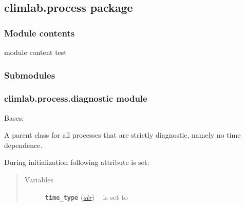 \documentclass[letterpaper,10pt,english]{sphinxmanual}
\begin{document}
\subsection{climlab.process package}
\label{api/climlab.process:climlab-process-package}\label{api/climlab.process::doc}

\subsubsection{Module contents}
\label{api/climlab.process:module-climlab.process}\label{api/climlab.process:module-contents}
module content test


\subsubsection{Submodules}
\label{api/climlab.process:submodules}

\subsubsection{climlab.process.diagnostic module}
\label{api/climlab.process:module-climlab.process.diagnostic}\label{api/climlab.process:climlab-process-diagnostic-module}

\begin{fulllineitems}
\label{api/climlab.process:climlab.process.diagnostic.DiagnosticProcess}
Bases: {\hyperref[api/climlab.process:climlab.process.time_dependent_process.TimeDependentProcess]{\emph{}}}

A parent class for all processes that are strictly diagnostic, namely
no time dependence.

During initialization following attribute is set:
\begin{quote}\begin{description}
\item[{Variables}] \leavevmode
\textbf{\texttt{time\_type}} (\href{http://docs.python.org/2.7/library/functions.html\#str}{\emph{str}}) -- is set to 

\end{description}\end{quote}

\end{fulllineitems}
\end{document}
